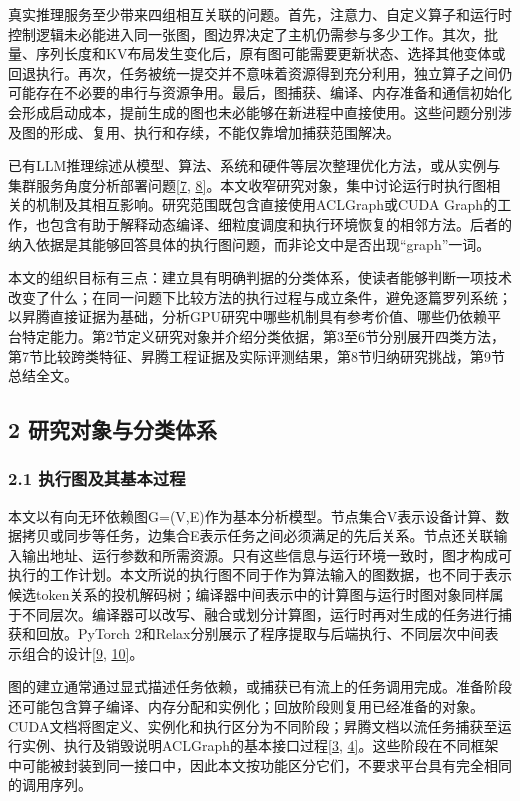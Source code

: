 \documentclass[UTF8,11pt,fontset=windows]{ctexart}
\begin{document}
真实推理服务至少带来四组相互关联的问题。首先，注意力、自定义算子和运行时控制逻辑未必能进入同一张图，图边界决定了主机仍需参与多少工作。其次，批量、序列长度和KV布局发生变化后，原有图可能需要更新状态、选择其他变体或回退执行。再次，任务被统一提交并不意味着资源得到充分利用，独立算子之间仍可能存在不必要的串行与资源争用。最后，图捕获、编译、内存准备和通信初始化会形成启动成本，提前生成的图也未必能够在新进程中直接使用。这些问题分别涉及图的形成、复用、执行和存续，不能仅靠增加捕获范围解决。

已有LLM推理综述从模型、算法、系统和硬件等层次整理优化方法，或从实例与集群服务角度分析部署问题\protect\hyperlink{ref-7}{{[}7}, \protect\hyperlink{ref-8}{8{]}}。本文收窄研究对象，集中讨论运行时执行图相关的机制及其相互影响。研究范围既包含直接使用ACLGraph或CUDA Graph的工作，也包含有助于解释动态编译、细粒度调度和执行环境恢复的相邻方法。后者的纳入依据是其能够回答具体的执行图问题，而非论文中是否出现``graph''一词。

本文的组织目标有三点：建立具有明确判据的分类体系，使读者能够判断一项技术改变了什么；在同一问题下比较方法的执行过程与成立条件，避免逐篇罗列系统；以昇腾直接证据为基础，分析GPU研究中哪些机制具有参考价值、哪些仍依赖平台特定能力。第2节定义研究对象并介绍分类依据，第3至6节分别展开四类方法，第7节比较跨类特征、昇腾工程证据及实际评测结果，第8节归纳研究挑战，第9节总结全文。

\hypertarget{section-2}{%
\subsection{2 研究对象与分类体系}\label{section-2}}

\hypertarget{section-2-1}{%
\subsubsection{2.1 执行图及其基本过程}\label{section-2-1}}

本文以有向无环依赖图G=(V,E)作为基本分析模型。节点集合V表示设备计算、数据拷贝或同步等任务，边集合E表示任务之间必须满足的先后关系。节点还关联输入输出地址、运行参数和所需资源。只有这些信息与运行环境一致时，图才构成可执行的工作计划。本文所说的执行图不同于作为算法输入的图数据，也不同于表示候选token关系的投机解码树；编译器中间表示中的计算图与运行时图对象同样属于不同层次。编译器可以改写、融合或划分计算图，运行时再对生成的任务进行捕获和回放。PyTorch 2和Relax分别展示了程序提取与后端执行、不同层次中间表示组合的设计\protect\hyperlink{ref-9}{{[}9}, \protect\hyperlink{ref-10}{10{]}}。

图的建立通常通过显式描述任务依赖，或捕获已有流上的任务调用完成。准备阶段还可能包含算子编译、内存分配和实例化；回放阶段则复用已经准备的对象。CUDA文档将图定义、实例化和执行区分为不同阶段；昇腾文档以流任务捕获至运行实例、执行及销毁说明ACLGraph的基本接口过程\protect\hyperlink{ref-3}{{[}3}, \protect\hyperlink{ref-4}{4{]}}。这些阶段在不同框架中可能被封装到同一接口中，因此本文按功能区分它们，不要求平台具有完全相同的调用序列。
\end{document}
